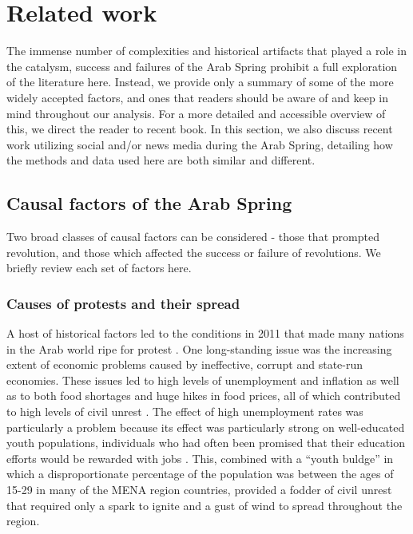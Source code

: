 \section{Related work}

The immense number of complexities and historical artifacts that played a role in the catalysm, success and failures of the Arab Spring prohibit a full exploration of the literature here.  Instead, we provide only a summary of some of the more widely accepted factors, and ones that readers should be aware of and keep in mind throughout our analysis. For a more detailed and accessible overview of this, we direct the reader to  recent book. In this section, we also discuss recent work utilizing social and/or news media during the Arab Spring, detailing how the methods and data used here are both similar and different.  

\subsection{Causal factors of the Arab Spring}

Two broad classes of causal factors can be considered - those that prompted revolution, and those which affected the success or failure of revolutions.  We briefly review each set of factors here.


\subsubsection{Causes of protests and their spread}

A host of historical factors led to the conditions in 2011 that made many nations in the Arab world ripe for protest \cite{gelvin_arab_2015}.  One long-standing issue was the increasing extent of economic problems caused by ineffective, corrupt and state-run economies.  These issues led to high levels of unemployment and inflation \cite{dewey_impact_2012} as well as to both food shortages and huge hikes in food prices, all of which contributed to high levels of civil unrest \cite{goldstone_cross-class_2011,comunello_will_2012}.  The effect of high unemployment rates was particularly a problem because its effect was particularly strong on well-educated youth populations, individuals who had often been promised that their education efforts would be rewarded with jobs \cite{dewey_impact_2012,gelvin_arab_2015}. This, combined with a ``youth buldge'' in which a disproportionate percentage of the population was  between the ages of 15-29 in many of the MENA region countries, provided a fodder of civil unrest that required only a spark to ignite and a gust of wind to spread throughout the region.

